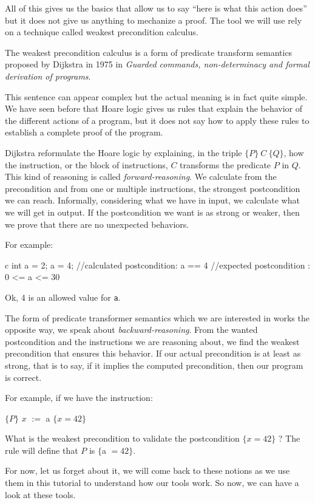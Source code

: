 All of this gives us the basics that allow us to say ``here is what
this action does'' but it does not give us anything to mechanize a
proof. The tool we will use rely on a technique called weakest
precondition calculus.





The weakest precondition calculus is a form of predicate transform
semantics proposed by Dijkstra in 1975 in \emph{Guarded commands,
non-determinacy and formal derivation of programs}.

This sentence can appear complex but the actual meaning is in fact quite
simple. We have seen before that Hoare logic gives us rules that explain
the behavior of the different actions of a program, but it does not say
how to apply these rules to establish a complete proof of the program.

Dijkstra reformulate the Hoare logic by explaining, in the triple
$\{P\}\ C\ \{Q\}$, how the instruction, or the block of instructions,
$C$ transforms the predicate $P$ in $Q$. This kind of reasoning is
called \emph{forward-reasoning}. We calculate from the precondition and
from one or multiple instructions, the strongest postcondition we can
reach. Informally, considering what we have in input, we calculate what
we will get in output. If the postcondition we want is as strong or
weaker, then we prove that there are no unexpected behaviors.



For example:



\begin{CodeBlock}{c}
int a = 2;
a = 4;
//calculated postcondition: a == 4
//expected postcondition  : 0 <= a <= 30
\end{CodeBlock}



Ok, 4 is an allowed value for \texttt{a}.



The form of predicate transformer semantics which we are interested in
works the opposite way, we speak about \emph{backward-reasoning}. From
the wanted postcondition and the instructions we are reasoning about, we
find the weakest precondition that ensures this behavior. If our actual
precondition is at least as strong, that is to say, if it implies the
computed precondition, then our program is correct.



For example, if we have the instruction:



$\{P\}$ $x$ $:=$ a $\{x = 42\}$



What is the weakest precondition to validate the postcondition
$\{x = 42\}$ ? The rule will define that $P$ is $\{$a $=42\}$.



For now, let us forget about it, we will come back to these notions as
we use them in this tutorial to understand how our tools work. So now,
we can have a look at these tools.
